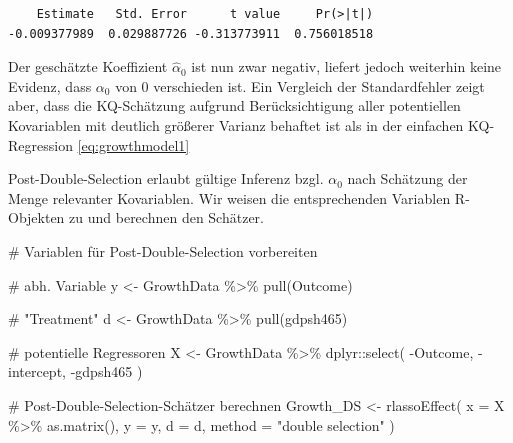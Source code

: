 \documentclass[
  a4paper,
  DIV=11,
  oneside]{scrreprt}
\newenvironment{Shaded}{\begin{snugshade}}{\end{snugshade}}
\newcommand{\AttributeTok}[1]{\textcolor[rgb]{0.40,0.45,0.13}{#1}}
\newcommand{\CommentTok}[1]{\textcolor[rgb]{0.37,0.37,0.37}{#1}}
\newcommand{\FunctionTok}[1]{\textcolor[rgb]{0.28,0.35,0.67}{#1}}
\newcommand{\NormalTok}[1]{\textcolor[rgb]{0.00,0.23,0.31}{#1}}
\newcommand{\OtherTok}[1]{\textcolor[rgb]{0.00,0.23,0.31}{#1}}
\newcommand{\SpecialCharTok}[1]{\textcolor[rgb]{0.37,0.37,0.37}{#1}}
\newcommand{\StringTok}[1]{\textcolor[rgb]{0.13,0.47,0.30}{#1}}
\begin{document}
\begin{verbatim}
    Estimate   Std. Error      t value     Pr(>|t|) 
-0.009377989  0.029887726 -0.313773911  0.756018518 
\end{verbatim}

Der geschätzte Koeffizient \(\widehat{\alpha}_0\) ist nun zwar negativ,
liefert jedoch weiterhin keine Evidenz, dass \(\alpha_0\) von 0
verschieden ist. Ein Vergleich der Standardfehler zeigt aber, dass die
KQ-Schätzung aufgrund Berücksichtigung aller potentiellen Kovariablen
mit deutlich größerer Varianz behaftet ist als in der einfachen
KQ-Regression \eqref{eq:growthmodel1}

Post-Double-Selection erlaubt gültige Inferenz bzgl. \(\alpha_0\) nach
Schätzung der Menge relevanter Kovariablen. Wir weisen die
entsprechenden Variablen R-Objekten zu und berechnen den Schätzer.

\begin{Shaded}
\begin{Highlighting}[]
\CommentTok{\# Variablen für Post{-}Double{-}Selection vorbereiten}

\CommentTok{\# abh. Variable}
\NormalTok{y }\OtherTok{\textless{}{-}}\NormalTok{ GrowthData }\SpecialCharTok{\%\textgreater{}\%} 
  \FunctionTok{pull}\NormalTok{(Outcome)}

\CommentTok{\# "Treatment"}
\NormalTok{d }\OtherTok{\textless{}{-}}\NormalTok{ GrowthData }\SpecialCharTok{\%\textgreater{}\%} 
  \FunctionTok{pull}\NormalTok{(gdpsh465)}

\CommentTok{\# potentielle Regressoren}
\NormalTok{X }\OtherTok{\textless{}{-}}\NormalTok{ GrowthData }\SpecialCharTok{\%\textgreater{}\%} 
\NormalTok{  dplyr}\SpecialCharTok{::}\FunctionTok{select}\NormalTok{(}
    \SpecialCharTok{{-}}\NormalTok{Outcome, }\SpecialCharTok{{-}}\NormalTok{intercept, }\SpecialCharTok{{-}}\NormalTok{gdpsh465}
\NormalTok{  )}
\end{Highlighting}
\end{Shaded}

\begin{Shaded}
\begin{Highlighting}[]
\CommentTok{\# Post{-}Double{-}Selection{-}Schätzer berechnen}
\NormalTok{Growth\_DS }\OtherTok{\textless{}{-}} 
  \FunctionTok{rlassoEffect}\NormalTok{(}
    \AttributeTok{x =}\NormalTok{ X }\SpecialCharTok{\%\textgreater{}\%} 
      \FunctionTok{as.matrix}\NormalTok{(), }
    \AttributeTok{y =}\NormalTok{ y, }
    \AttributeTok{d =}\NormalTok{ d, }
    \AttributeTok{method =} \StringTok{"double selection"}
\NormalTok{)}
\end{Highlighting}
\end{Shaded}
\end{document}
